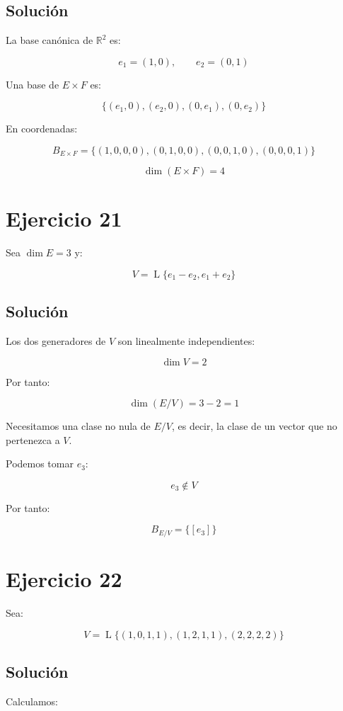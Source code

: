 \documentclass[11pt,a4paper]{article}
\newcommand{\R}{\mathbb{R}}
\newcommand{\Span}{\operatorname{L}}
\newcommand{\dimn}{\operatorname{dim}}
\begin{document}
	\subsection{Solución}

	La base canónica de $\R^2$ es:

	\[
	e_1=(1,0),
	\qquad
	e_2=(0,1)
	\]

	Una base de $E\times F$ es:

	\[
	\{(e_1,0),(e_2,0),(0,e_1),(0,e_2)\}
	\]

	En coordenadas:

	\[
	\boxed{
	B_{E\times F}
	=
	\{(1,0,0,0),(0,1,0,0),(0,0,1,0),(0,0,0,1)\}
	}
	\]

	\[
	\boxed{
	\dimn(E\times F)=4
	}
	\]

\section{Ejercicio 21}
	Sea $\dimn E=3$ y:

	\[
	V=
	\Span\{e_1-e_2,e_1+e_2\}
	\]

	\subsection{Solución}

	Los dos generadores de $V$ son linealmente independientes:

	\[
	\dimn V=2
	\]

	Por tanto:

	\[
	\dimn(E/V)
	=
	3-2
	=
	1
	\]

	Necesitamos una clase no nula de $E/V$, es decir, la clase de un vector que no pertenezca a $V$.

	Podemos tomar $e_3$:

	\[
	e_3\notin V
	\]

	Por tanto:

	\[
	\boxed{
	B_{E/V}
	=
	\{[e_3]\}
	}
	\]

\section{Ejercicio 22}
	Sea:

	\[
	V=
	\Span\{(1,0,1,1),(1,2,1,1),(2,2,2,2)\}
	\]

	\subsection{Solución}

	Calculamos:
\end{document}
